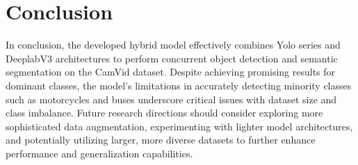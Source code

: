 \documentclass[conference]{IEEEtran}
\begin{document}


\section{Conclusion}


In conclusion, the developed hybrid model effectively combines Yolo series and DeeplabV3 architectures to perform concurrent object detection and semantic segmentation on the CamVid dataset. Despite achieving promising results for dominant classes, the model's limitations in accurately detecting minority classes such as motorcycles and buses underscore critical issues with dataset size and class imbalance. Future research directions should consider exploring more sophisticated data augmentation, experimenting with lighter model architectures, and potentially utilizing larger, more diverse datasets to further enhance performance and generalization capabilities.

\end{document}
